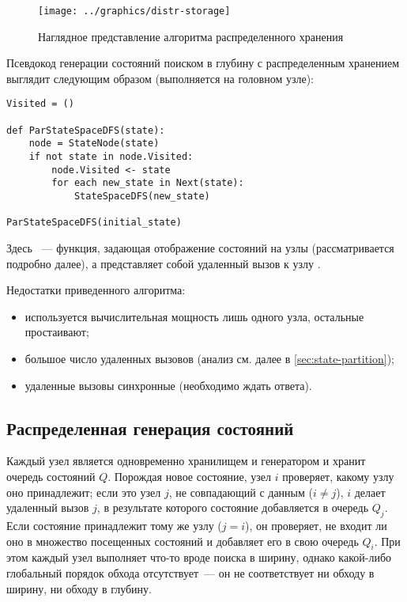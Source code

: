 \begin{figure}[!htb]
  \centering
  \texttt{[image: ../graphics/distr-storage]}
  \caption{Наглядное представление алгоритма распределенного хранения}
  \label{fig:distr-storage}
\end{figure}

Псевдокод генерации состояний поиском в глубину с распределенным хранением выглядит
следующим образом (выполняется на головном узле):

\begin{lstlisting}[style=pseudocode]
Visited = ()

def ParStateSpaceDFS(state):
    node = StateNode(state)
    if not state in node.Visited:
        node.Visited <- state
        for each new_state in Next(state):
            StateSpaceDFS(new_state)

ParStateSpaceDFS(initial_state)
\end{lstlisting}

Здесь ~--- функция, задающая отображение состояний на узлы (рассматривается
подробно далее), а  представляет собой удаленный вызов к узлу
.

Недостатки приведенного алгоритма:
\begin{itemize}
\item используется вычислительная мощность лишь одного узла, остальные простаивают;
\item большое число удаленных вызовов (анализ см. далее в \ref{sec:state-partition});
\item удаленные вызовы синхронные (необходимо ждать ответа).
\end{itemize}

\subsection{Распределенная генерация состояний}
\label{sec:distr-generation}

Каждый узел является одновременно хранилищем и генератором и хранит очередь состояний
$Q$. Порождая новое состояние, узел $i$ проверяет, какому узлу оно принадлежит; если это
узел $j$, не совпадающий с данным ($i \neq j$), $i$ делает удаленный вызов $j$, в
результате которого состояние добавляется в очередь $Q_j$. Если состояние принадлежит тому
же узлу ($j = i$), он проверяет, не входит ли оно в множество посещенных состояний
 и добавляет его в свою очередь $Q_i$. При этом каждый узел выполняет что-то
вроде поиска в ширину, однако какой-либо глобальный порядок обхода отсутствует~--- он не
соответствует ни обходу в ширину, ни обходу в глубину.

